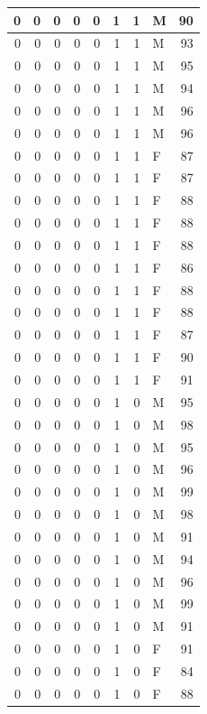 \documentclass[
  12pt,
]{krantz}
\begin{document}
\begin{tabular}{r|r|r|r|r|r|r|l|r}
\hline
0 & 0 & 0 & 0 & 0 & 1 & 1 & M & 90\\
\hline
0 & 0 & 0 & 0 & 0 & 1 & 1 & M & 93\\
\hline
0 & 0 & 0 & 0 & 0 & 1 & 1 & M & 95\\
\hline
0 & 0 & 0 & 0 & 0 & 1 & 1 & M & 94\\
\hline
0 & 0 & 0 & 0 & 0 & 1 & 1 & M & 96\\
\hline
0 & 0 & 0 & 0 & 0 & 1 & 1 & M & 96\\
\hline
0 & 0 & 0 & 0 & 0 & 1 & 1 & F & 87\\
\hline
0 & 0 & 0 & 0 & 0 & 1 & 1 & F & 87\\
\hline
0 & 0 & 0 & 0 & 0 & 1 & 1 & F & 88\\
\hline
0 & 0 & 0 & 0 & 0 & 1 & 1 & F & 88\\
\hline
0 & 0 & 0 & 0 & 0 & 1 & 1 & F & 88\\
\hline
0 & 0 & 0 & 0 & 0 & 1 & 1 & F & 86\\
\hline
0 & 0 & 0 & 0 & 0 & 1 & 1 & F & 88\\
\hline
0 & 0 & 0 & 0 & 0 & 1 & 1 & F & 88\\
\hline
0 & 0 & 0 & 0 & 0 & 1 & 1 & F & 87\\
\hline
0 & 0 & 0 & 0 & 0 & 1 & 1 & F & 90\\
\hline
0 & 0 & 0 & 0 & 0 & 1 & 1 & F & 91\\
\hline
0 & 0 & 0 & 0 & 0 & 1 & 0 & M & 95\\
\hline
0 & 0 & 0 & 0 & 0 & 1 & 0 & M & 98\\
\hline
0 & 0 & 0 & 0 & 0 & 1 & 0 & M & 95\\
\hline
0 & 0 & 0 & 0 & 0 & 1 & 0 & M & 96\\
\hline
0 & 0 & 0 & 0 & 0 & 1 & 0 & M & 99\\
\hline
0 & 0 & 0 & 0 & 0 & 1 & 0 & M & 98\\
\hline
0 & 0 & 0 & 0 & 0 & 1 & 0 & M & 91\\
\hline
0 & 0 & 0 & 0 & 0 & 1 & 0 & M & 94\\
\hline
0 & 0 & 0 & 0 & 0 & 1 & 0 & M & 96\\
\hline
0 & 0 & 0 & 0 & 0 & 1 & 0 & M & 99\\
\hline
0 & 0 & 0 & 0 & 0 & 1 & 0 & M & 91\\
\hline
0 & 0 & 0 & 0 & 0 & 1 & 0 & F & 91\\
\hline
0 & 0 & 0 & 0 & 0 & 1 & 0 & F & 84\\
\hline
0 & 0 & 0 & 0 & 0 & 1 & 0 & F & 88\\

\end{tabular}
\end{document}
